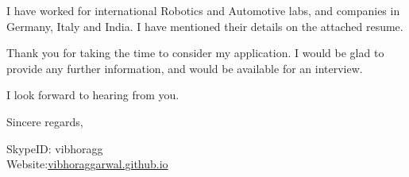 \documentclass{letter} %
\begin{document}
\begin{letter}
 I have worked for international Robotics and Automotive labs, and companies in Germany, Italy and India. I have mentioned their details on the attached resume. 


Thank you for taking the time to consider my application. I would be glad to provide any further information, and would be available for an interview.

I look forward to hearing from you.
\closing{Sincere regards,} 
SkypeID: vibhoragg\\
Website:\href{https://vibhoraggarwal.github.io/}{vibhoraggarwal.github.io}

\end{letter}
 
\end{document}
